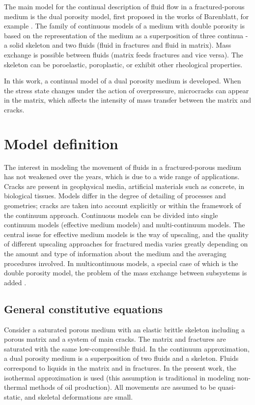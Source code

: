 \documentclass[article,authoryear,jpm]{beg_39}             %
\begin{document}
The main model for the continual description of fluid flow in a fractured-porous medium is the dual porosity model, first proposed in the works of Barenblatt, for example \cite{Barenblatt}.
The family of continuous models of a medium with double porosity is based on the representation of the medium as a superposition of three continua - a solid skeleton and two fluids (fluid in fractures and fluid in matrix).
Mass exchange is possible between fluids (matrix feeds fractures and vice versa).
The skeleton can be poroelastic, poroplastic, or exhibit other rheological properties.

In this work, a continual model of a dual porosity medium is developed.
When the stress state changes under the action of overpressure, microcracks can appear in the matrix, which affects the intensity of mass transfer between the matrix and cracks.

\section{Model definition}
\label{sec:1}
The interest in modeling the movement of fluids in a fractured-porous medium has not weakened over the years, which is due to a wide range of applications.
Cracks are present in geophysical media, artificial materials such as concrete, in biological tissues.
Models differ in the degree of detailing of processes and geometries; cracks are taken into account explicitly or within the framework of the continuum approach.
Continuous models can be divided into single continuum models (effective medium models) and multi-continuum models.
The central issue for effective medium models is the way of upscaling, and the quality of different upscaling approaches for fractured media varies greatly depending on the amount and type of information about the medium and the averaging procedures involved.
In multicontinuous models, a special case of which is the double porosity model, the problem of the mass exchange between subsystems is added \cite{Berre}.


\subsection{General constitutive equations}
\label{sec:2}
Consider a saturated porous medium with an elastic brittle skeleton including a porous matrix and a system of main cracks.
The matrix and fractures are saturated with the same low-compressible fluid.
In the continuum approximation, a dual porosity medium is a superposition of two fluids and a skeleton.
Fluids correspond to liquids in the matrix and in fractures.
In the present work, the isothermal approximation is used (this assumption is traditional in modeling non-thermal methods of oil production).
All movements are assumed to be quasi-static, and skeletal deformations are small.
\end{document}
